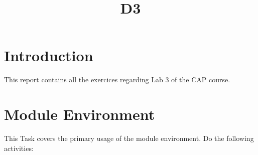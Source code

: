\documentclass{aux}
\title{D3} %
\begin{document}




        
\fairemarges %
\fairepagedegarde
\tabledematieres
\section{Introduction}
This report contains all the exercices regarding Lab 3 of the CAP course.
\section{Module Environment}
This Task covers the primary usage of the module environment. Do the following
activities:
\end{document}

